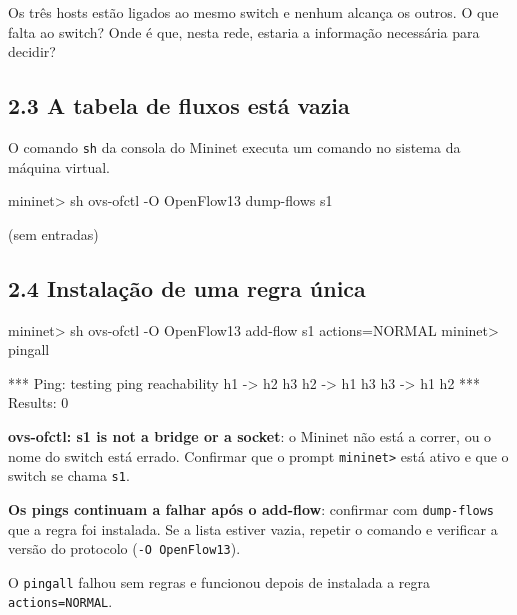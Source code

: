 \documentclass[11pt,a4paper]{article}
\newcommand{\cmd}[1]{\texttt{#1}}
\begin{document}
\begin{observe}
Os três hosts estão ligados ao mesmo switch e nenhum alcança os outros. O que falta ao switch? Onde é que, nesta rede, estaria a informação necessária para decidir?
\end{observe}

\subsection*{2.3 A tabela de fluxos está vazia}

O comando \cmd{sh} da consola do Mininet executa um comando no sistema da máquina virtual.

\begin{terminal}
mininet> sh ovs-ofctl -O OpenFlow13 dump-flows s1
\end{terminal}

\begin{saida}
(sem entradas)
\end{saida}

\subsection*{2.4 Instalação de uma regra única}

\begin{terminal}
mininet> sh ovs-ofctl -O OpenFlow13 add-flow s1 actions=NORMAL
mininet> pingall
\end{terminal}

\begin{saida}
*** Ping: testing ping reachability
h1 -> h2 h3
h2 -> h1 h3
h3 -> h1 h2
*** Results: 0%
\end{saida}

\begin{erro}
\textbf{ovs-ofctl: s1 is not a bridge or a socket}: o Mininet não está a correr, ou o nome do switch está errado. Confirmar que o prompt \cmd{mininet>} está ativo e que o switch se chama \cmd{s1}.

\textbf{Os pings continuam a falhar após o add-flow}: confirmar com \cmd{dump-flows} que a regra foi instalada. Se a lista estiver vazia, repetir o comando e verificar a versão do protocolo (\cmd{-O OpenFlow13}).
\end{erro}

\begin{feito}
O \cmd{pingall} falhou sem regras e funcionou depois de instalada a regra \cmd{actions=NORMAL}.
\end{feito}
\end{document}

